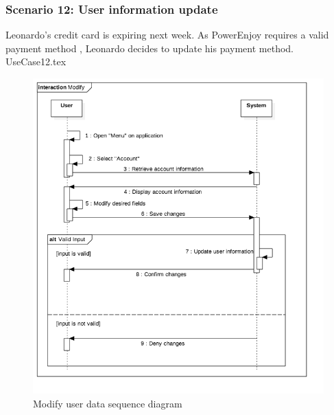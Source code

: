 \documentclass[12pt]{article}
\begin{document}
		\subsubsection{Scenario 12: User information update}
		Leonardo's credit card is expiring next week. As PowerEnjoy requires a valid payment method ,
		Leonardo decides to update his payment method.
		\FloatBarrier
		{UseCase12.tex}
		\newpage
		\begin{figure}[htbp]
		\begin{center}
		\caption{Modify user data sequence diagram}
		\includegraphics[scale=0.51]{Images/SequenceDiagram/Modify.png}
		\end{center} 	 	
 	 	\end{figure}
 	 	\clearpage
 	 	
\end{document}
